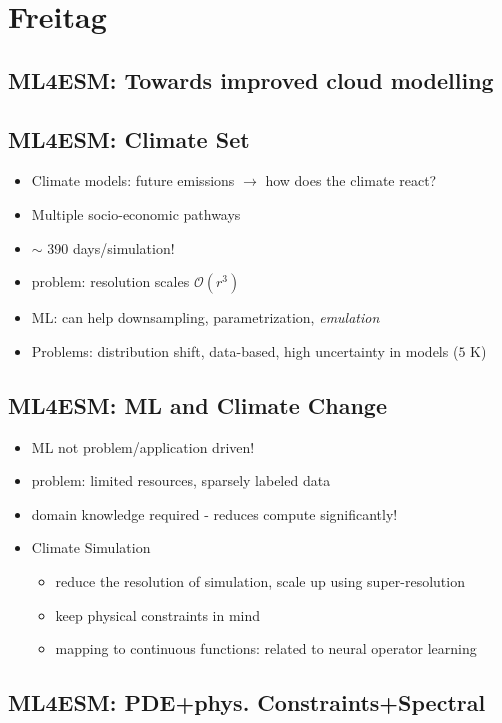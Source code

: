 \documentclass[a4paper]{article}
\begin{document}
\section*{Freitag}
\subsection*{ML4ESM: Towards improved cloud modelling}
\subsection*{ML4ESM: Climate Set}
\begin{itemize}
    \item Climate models: future emissions $\rightarrow$ how does the climate react?
    \item Multiple socio-economic pathways
    \item $\sim$ 390 days/simulation!
    \item problem: resolution scales $\mathcal{O}(r^3)$
    \item ML: can help downsampling, parametrization, \emph{emulation}
    \item Problems: distribution shift, data-based, high uncertainty in models ($5$ K)
\end{itemize}
\subsection*{ML4ESM: ML and Climate Change}
\begin{itemize}
    \item ML not problem/application driven!
    \item problem: limited resources, sparsely labeled data
    \item domain knowledge required - reduces compute significantly!
    \item Climate Simulation
          \begin{itemize}
              \item reduce the resolution of simulation, scale up using super-resolution
              \item keep physical constraints in mind
              \item mapping to continuous functions: related to neural operator learning
          \end{itemize}
\end{itemize}
\subsection*{ML4ESM: PDE+phys. Constraints+Spectral}
\end{document}
